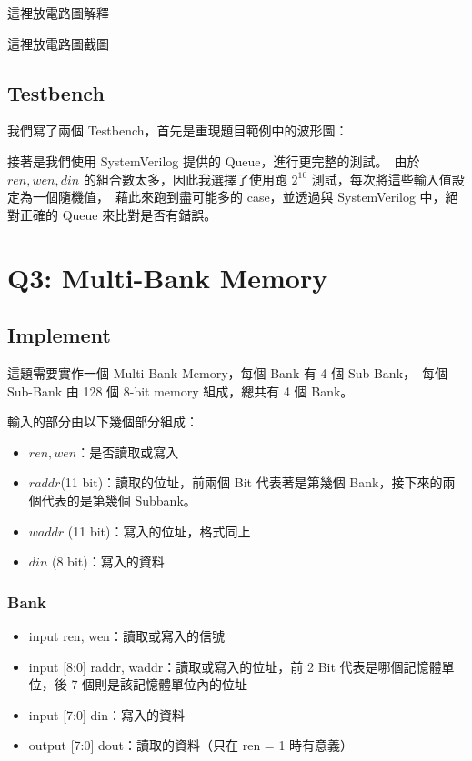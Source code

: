 \documentclass[10.5pt,compsoc,UTF8]{CjC}
\theoremstyle{mystyle}
\begin{document}
這裡放電路圖解釋

這裡放電路圖截圖

\subsection{Testbench}
我們寫了兩個 Testbench，首先是重現題目範例中的波形圖：


接著是我們使用 SystemVerilog 提供的 Queue，進行更完整的測試。\
由於 $ren, wen, din$ 的組合數太多，因此我選擇了使用跑 $2^10$ 測試，每次將這些輸入值設定為一個隨機值，\
藉此來跑到盡可能多的 case，並透過與 SystemVerilog 中，絕對正確的 Queue 來比對是否有錯誤。


\section{Q3: Multi-Bank Memory}
\label{sec:Q3}

\subsection{Implement}

這題需要實作一個 Multi-Bank Memory，每個 Bank 有 4 個 Sub-Bank，\
每個 Sub-Bank 由 128 個 8-bit memory 組成，總共有 4 個 Bank。

輸入的部分由以下幾個部分組成：
\begin{itemize}
  \item $ren, wen$：是否讀取或寫入
  \item $raddr$(11 bit)：讀取的位址，前兩個 Bit 代表著是第幾個 Bank，接下來的兩個代表的是第幾個 Subbank。
  \item $waddr$ (11 bit)：寫入的位址，格式同上
  \item $din$ (8 bit)：寫入的資料
\end{itemize}



\subsubsection*{Bank}

\begin{itemize}
  \item input ren, wen：讀取或寫入的信號
  \item input [8:0] raddr, waddr：讀取或寫入的位址，前 2 Bit 代表是哪個記憶體單位，後 7 個則是該記憶體單位內的位址
  \item input [7:0] din：寫入的資料
  \item output [7:0] dout：讀取的資料（只在 ren = 1 時有意義）
\end{itemize}
\end{document}

